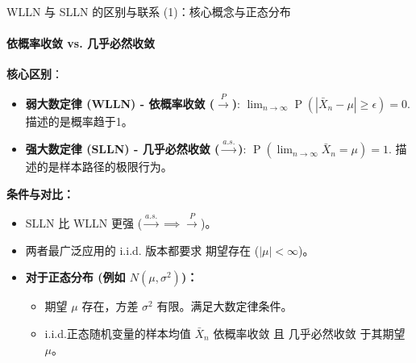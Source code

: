 \documentclass[UTF8]{beamer}
\DeclareMathOperator{\Prob}{\operatorname{P}}
\begin{document}
\begin{frame}[shrink=5]{WLLN 与 SLLN 的区别与联系 (1)：核心概念与正态分布}
    \framesubtitle{依概率收敛 vs. 几乎必然收敛}
    \textbf{核心区别}：
    \begin{itemize}
        \item \textbf{弱大数定律 (WLLN) - \alert{依概率收敛} ($\xrightarrow{P}$)}: $\lim_{n \to \infty} \Prob(|\bar{X}_n - \mu| \geq \epsilon) = 0$. 描述的是\alert{概率}趋于1。
        \item \textbf{强大数定律 (SLLN) - \alert{几乎必然收敛} ($\xrightarrow{a.s.}$)}: $\Prob(\lim_{n \to \infty} \bar{X}_n = \mu) = 1$. 描述的是\alert{样本路径}的极限行为。
    \end{itemize}
    \pause
    \textbf{条件与对比：}
    \begin{itemize}
        \item SLLN 比 WLLN \alert{更强} ($\xrightarrow{a.s.} \implies \xrightarrow{P}$)。
        \item 两者最广泛应用的 i.i.d. 版本都要求 \alert{期望存在} ($|\mu| < \infty$)。
        \item \textbf{对于正态分布 (例如 $N(\mu, \sigma^2)$)：}
            \begin{itemize}
                \item 期望 $\mu$ 存在，方差 $\sigma^2$ 有限。满足大数定律条件。
                \item i.i.d.正态随机变量的样本均值 $\bar{X}_n$ \alert{依概率收敛} 且 \alert{几乎必然收敛} 于其期望 $\mu$。
            \end{itemize}
    \end{itemize}
\end{frame}
\end{document}
